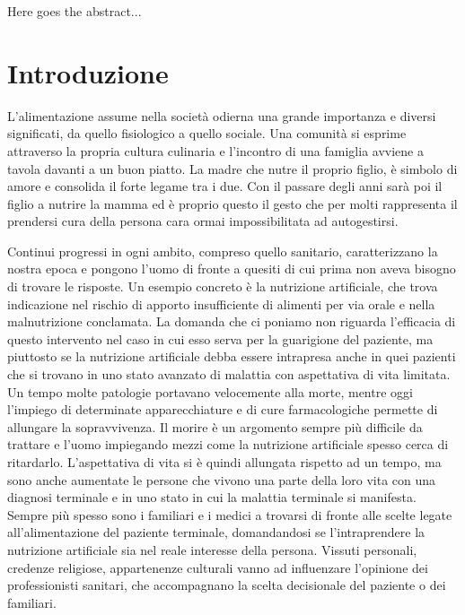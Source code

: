 \documentclass[11pt,a4paper,oneside]{book}
\begin{document}
Here goes the abstract...



\chapter*{Introduzione}
L'alimentazione assume nella societ\`a odierna una grande importanza e diversi significati, da quello fisiologico a quello sociale. Una comunit\`a si esprime attraverso la propria cultura culinaria e l'incontro di una famiglia avviene a tavola davanti a un buon piatto. La madre che nutre il proprio figlio, \`e simbolo di amore e consolida il forte legame tra i due. Con il passare degli anni sar\`a poi il figlio a nutrire la mamma ed \`e proprio questo il gesto che per molti rappresenta il prendersi cura della persona cara ormai impossibilitata ad autogestirsi. 

Continui progressi in ogni ambito, compreso quello sanitario, caratterizzano la nostra epoca e pongono l'uomo di fronte a quesiti di cui prima non aveva bisogno di trovare le risposte. Un esempio concreto \`e la nutrizione artificiale, che trova indicazione nel rischio di apporto insufficiente di alimenti per via orale e nella malnutrizione conclamata. 
La domanda che ci poniamo non riguarda l'efficacia di questo intervento nel caso in cui esso serva per la guarigione del paziente, ma piuttosto se la nutrizione artificiale debba essere intrapresa anche in quei pazienti che si trovano in uno stato avanzato di malattia con aspettativa di vita limitata.
Un tempo molte patologie portavano velocemente alla morte, mentre oggi l'impiego di determinate apparecchiature e di cure farmacologiche permette di allungare la sopravvivenza. Il morire \`e un argomento sempre pi\`u difficile da trattare e l'uomo impiegando mezzi come la nutrizione artificiale spesso cerca di ritardarlo. L'aspettativa di vita si \`e quindi allungata rispetto ad un tempo, ma sono anche aumentate le persone che vivono una parte della loro vita con una diagnosi terminale e in uno stato in cui la malattia terminale si manifesta. 
Sempre pi\`u spesso sono i familiari e i medici a trovarsi di fronte alle scelte legate all'alimentazione del paziente terminale, domandandosi se l'intraprendere la nutrizione artificiale sia nel reale interesse della persona. Vissuti personali, credenze religiose, appartenenze culturali vanno ad influenzare l'opinione dei professionisti sanitari, che accompagnano la scelta decisionale del paziente o dei familiari. 
\end{document}
